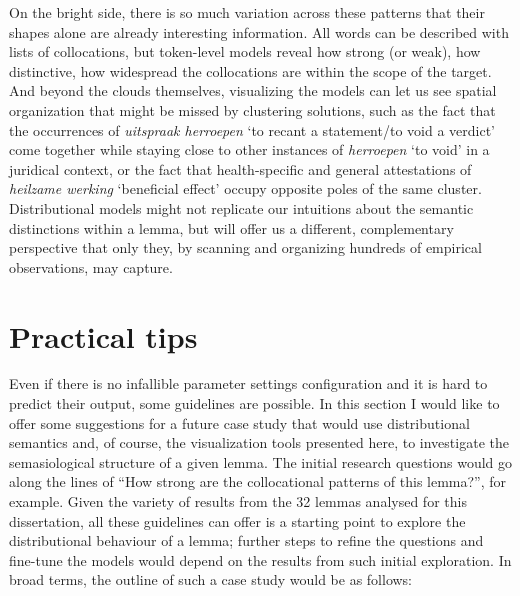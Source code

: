\documentclass[
]{book}
\begin{document}
On the bright side, there is so much variation across these patterns that their shapes alone are already interesting information. All words can be described with lists of collocations, but token-level models reveal how strong (or weak), how distinctive, how widespread the collocations are within the scope of the target. And beyond the clouds themselves, visualizing the models can let us see spatial organization that might be missed by clustering solutions, such as the fact that the occurrences of \emph{uitspraak herroepen} `to recant a statement/to void a verdict' come together while staying close to other instances of \emph{herroepen} `to void' in a juridical context, or the fact that health-specific and general attestations of \emph{heilzame werking} `beneficial effect' occupy opposite poles of the same cluster. Distributional models might not replicate our intuitions about the semantic distinctions within a lemma, but will offer us a different, complementary perspective that only they, by scanning and organizing hundreds of empirical observations, may capture.

\hypertarget{tips}{%
\section{Practical tips}\label{tips}}

Even if there is no infallible parameter settings configuration and it is hard to predict their output, some guidelines are possible. In this section I would like to offer some suggestions for a future case study that would use distributional semantics and, of course, the visualization tools presented here, to investigate the semasiological structure of a given lemma. The initial research questions would go along the lines of ``How strong are the collocational patterns of this lemma?'', for example. Given the variety of results from the 32 lemmas analysed for this dissertation, all these guidelines can offer is a starting point to explore the distributional behaviour of a lemma; further steps to refine the questions and fine-tune the models would depend on the results from such initial exploration. In broad terms, the outline of such a case study would be as follows:
\end{document}
